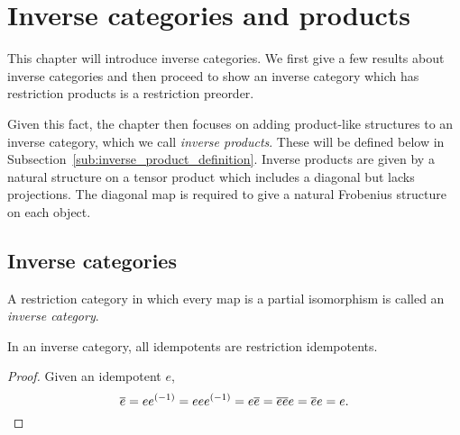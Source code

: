 \chapter{Inverse categories and products} %
\label{cha:inverse_categories}

This chapter will introduce inverse categories. We first give
a few results about inverse categories and then proceed to show an inverse category which has
restriction products is a restriction preorder.

Given this fact, the chapter then focuses on adding product-like structures to an inverse category,
which we call \emph{inverse products}. These will be defined below in
Subsection~\ref{sub:inverse_product_definition}. Inverse products are given by a natural structure
on a tensor product which includes a diagonal but lacks projections. The diagonal map is required to
give a natural Frobenius structure on each object.

\section{Inverse categories}
\label{sec:inverse_categories}

\begin{definition}\label{def:inverse_category}
  A restriction category in which every map is a partial
  isomorphism is called an \emph{inverse category}.
\end{definition}

\begin{lemma}
  \label{lem:inverse_idempotents_are_restriction_idempotents}
  In an inverse category, all idempotents are restriction idempotents.
\end{lemma}
\begin{proof}
  Given an idempotent $e$,
  \[
    \overline{e} = e{e}^{(-1)} = e e {e}^{(-1)} = e \overline{e} = \overline{e e} e = \overline{e} e = e.
  \]
\end{proof}

